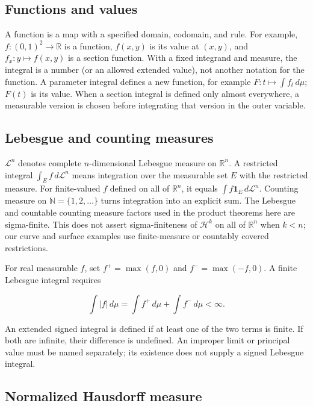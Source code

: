 \documentclass[
  11pt,
]{article}
\begin{document}
\subsection{Functions and values}\label{functions-and-values}

A function is a map with a specified domain, codomain, and rule. For
example, \(f:(0,1)^2\to\mathbb R\) is a function, \(f(x,y)\) is its
value at \((x,y)\), and \(f_x:y\mapsto f(x,y)\) is a section function.
With a fixed integrand and measure, the integral is a number (or an
allowed extended value), not another notation for the function. A
parameter integral defines a new function, for example
\(F:t\mapsto\int f_t\,d\mu\); \(F(t)\) is its value. When a section
integral is defined only almost everywhere, a measurable version is
chosen before integrating that version in the outer variable.

\subsection{Lebesgue and counting
measures}\label{lebesgue-and-counting-measures}

\(\mathcal L^n\) denotes complete \(n\)-dimensional Lebesgue measure on
\(\mathbb R^n\). A restricted integral \(\int_E f\,d\mathcal L^n\) means
integration over the measurable set \(E\) with the restricted measure.
For finite-valued \(f\) defined on all of \(\mathbb R^n\), it equals
\(\int f\mathbf1_E\,d\mathcal L^n\). Counting measure on
\(\mathbb N=\{1,2,\ldots\}\) turns integration into an explicit sum. The
Lebesgue and countable counting measure factors used in the product
theorems here are sigma-finite. This does not assert sigma-finiteness of
\(\mathcal H^k\) on all of \(\mathbb R^n\) when \(k<n\); our curve and
surface examples use finite-measure or countably covered restrictions.

For real measurable \(f\), set \(f^+=\max(f,0)\) and \(f^-=\max(-f,0)\).
A finite Lebesgue integral requires

\[
\int |f|\,d\mu=\int f^+\,d\mu+\int f^-\,d\mu<\infty.
\]

An extended signed integral is defined if at least one of the two terms
is finite. If both are infinite, their difference is undefined. An
improper limit or principal value must be named separately; its
existence does not supply a signed Lebesgue integral.

\subsection{Normalized Hausdorff
measure}\label{normalized-hausdorff-measure}
\end{document}
